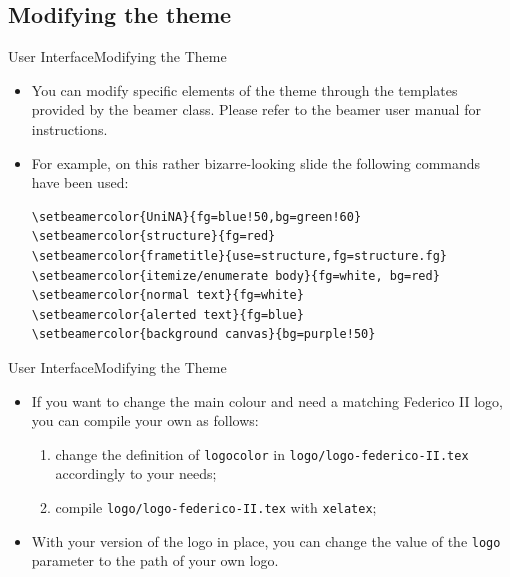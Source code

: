\documentclass[10pt,aspectratio=169
	]{beamer}
\begin{document}
\subsection{Modifying the theme}
{
\begin{frame}[fragile]{User Interface}{Modifying the Theme}
  \begin{itemize}[<+->]
	\item You can modify specific elements of the theme through the 
	templates provided by the beamer class. Please refer to the beamer user manual for instructions.
    \item For example, on this rather bizarre-looking slide the following commands have been used:
	\begin{verbatim}
\setbeamercolor{UniNA}{fg=blue!50,bg=green!60}
\setbeamercolor{structure}{fg=red}
\setbeamercolor{frametitle}{use=structure,fg=structure.fg}
\setbeamercolor{itemize/enumerate body}{fg=white, bg=red}
\setbeamercolor{normal text}{fg=white}
\setbeamercolor{alerted text}{fg=blue}
\setbeamercolor{background canvas}{bg=purple!50}
	\end{verbatim}
  \end{itemize}
\end{frame}
}

\begin{frame}{User Interface}{Modifying the Theme}
	\begin{itemize}[<+->]
		\item If you want to change the main colour and need a matching Federico II logo,
		  	you can compile your own as follows:
		  	\begin{enumerate}[<+->]
				\item change the definition of \texttt{logocolor} in 
					\texttt{logo/logo-federico-II.tex} accordingly to your needs;
				\item compile \texttt{logo/logo-federico-II.tex} with \texttt{xelatex};
			\end{enumerate}
		\item With your version of the logo in place, you can change the value of the \texttt{logo}
			parameter to the path of your own logo.
	\end{itemize}
\end{frame}
\end{document}
